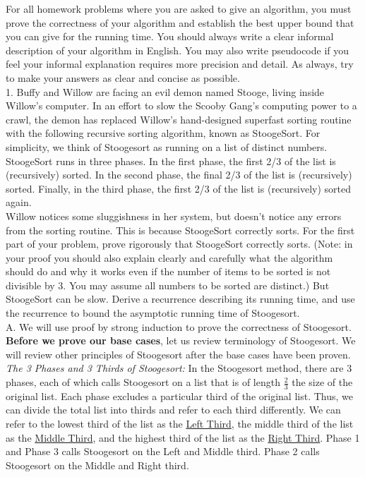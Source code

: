 \documentclass[11pt, solution, letterpaper]{format}
\begin{document}
For all homework problems where you are asked to give an algorithm, you must prove the correctness of your
algorithm and establish the best upper bound that you can give for the running time. You should always write a
clear informal description of your algorithm in English. You may also write pseudocode if you feel your informal
explanation requires more precision and detail. As always, try to make your answers as clear and concise as
possible.\\

1. Buffy and Willow are facing an evil demon named Stooge, living inside Willow’s computer. In an effort to
slow the Scooby Gang’s computing power to a crawl, the demon has replaced Willow’s hand-designed superfast sorting routine with the following recursive sorting algorithm, known as StoogeSort. For simplicity, we
think of Stoogesort as running on a list of distinct numbers. StoogeSort runs in three phases. In the first phase,
the first 2/3 of the list is (recursively) sorted. In the second phase, the final 2/3 of the list is (recursively) sorted.
Finally, in the third phase, the first 2/3 of the list is (recursively) sorted again. \\
Willow notices some sluggishness in her system, but doesn’t notice any errors from the sorting routine. This
is because StoogeSort correctly sorts. For the first part of your problem, prove rigorously that StoogeSort
correctly sorts. (Note: in your proof you should also explain clearly and carefully what the algorithm should
do and why it works even if the number of items to be sorted is not divisible by 3. You may assume all
numbers to be sorted are distinct.) But StoogeSort can be slow. Derive a recurrence describing its running
time, and use the recurrence to bound the asymptotic running time of Stoogesort.\\

A. We will use proof by strong induction to prove the correctness of Stoogesort.\\

\textbf{Before we prove our base cases}, let us review terminology of Stoogesort. We will review other principles of Stoogesort after the base cases have been proven.\\

\emph{The 3 Phases and 3 Thirds of Stoogesort:} In the Stoogesort method, there are 3 phases, each of which calls Stoogesort on a list that is of length $\frac{2}{3}$ the size of the original list. Each phase excludes a particular third of the original list. Thus, we can divide the total list into thirds and refer to each third differently. We can refer to the lowest third of the list as the \underline{Left Third}, the middle third of the list as the \underline{Middle Third}, and the highest third of the list as the \underline{Right Third}. Phase 1 and Phase 3 calls Stoogesort on the Left and Middle third. Phase 2 calls Stoogesort on the Middle and Right third. \\
\end{document}
